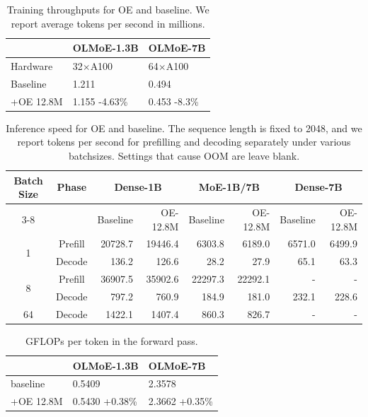 \begin{table}[h]
\centering
\begin{tabular}{lll}
\toprule
 & \textbf{OLMoE-1.3B} & \textbf{OLMoE-7B} \\
\midrule
Hardware & 32$\times$A100 & 64$\times$A100 \\
Baseline & 1.211 & 0.494 \\
+OE 12.8M & 1.155 \scriptsize -4.63\% & 0.453 \scriptsize-8.3\% \\
\bottomrule
\end{tabular}
\caption{Training throughputs for OE and baseline. We report average tokens per second in millions.}
\label{tab:training_throughputs}
\end{table}



\begin{table}[h!]
\centering
\begin{tabular}{cc|rr|rr|rr}
\hline
\multirow{2}{*}{\textbf{Batch Size}} & \multirow{2}{*}{\textbf{Phase}} 
& \multicolumn{2}{c|}{\textbf{Dense-1B}} 
& \multicolumn{2}{c|}{\textbf{MoE-1B/7B}} 
& \multicolumn{2}{c}{\textbf{Dense-7B}} \\
\cline{3-8}
& & Baseline & OE-12.8M & Baseline & OE-12.8M & Baseline & OE-12.8M \\
\hline
\multirow{2}{*}{1} 
& Prefill & 20728.7 & 19446.4 & 6303.8 & 6189.0 & 6571.0 & 6499.9 \\
& Decode  &   136.2 &   126.6 &   28.2 &   27.9 &   65.1 &   63.3 \\
\hline

\multirow{2}{*}{8} 
& Prefill & 36907.5 & 35902.6 & 22297.3 & 22292.1 & - & - \\
& Decode  &   797.2 &   760.9 &  184.9 &  181.0 &  232.1 &  228.6 \\
\hline
\multirow{1}{*}{64} 
& Decode  & 1422.1 & 1407.4 &  860.3 &  826.7 & - & - \\
\hline
\end{tabular}
\caption{Inference speed for OE and baseline. The sequence length is fixed to 2048, and we report tokens per second for prefilling and decoding separately under various batchsizes. Settings that cause OOM are leave blank.}
\label{tab:inference_speed}
\end{table}

\begin{table}[h!]
\centering
\begin{tabular}{lll}
\toprule
 & \textbf{OLMoE-1.3B} & \textbf{OLMoE-7B} \\
\midrule
baseline & 0.5409 & 2.3578 \\
+OE 12.8M & 0.5430 \scriptsize+0.38\% & 2.3662 \scriptsize+0.35\% \\
\bottomrule
\end{tabular}
\caption{GFLOPs per token in the forward pass.}
\label{tab:training_flops}
\end{table}

